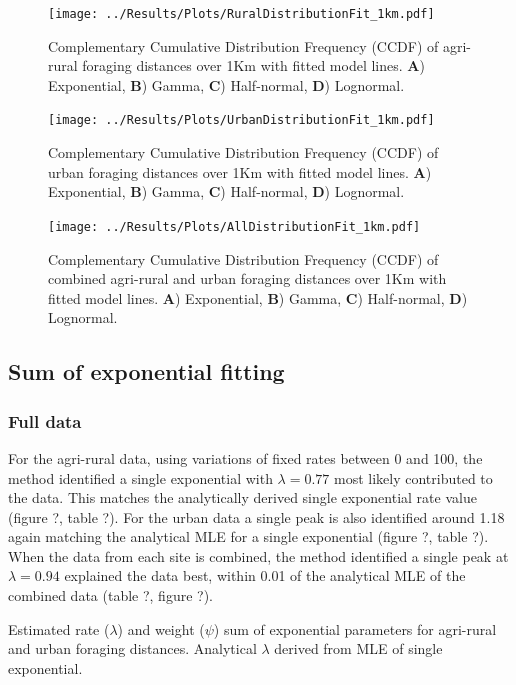 \documentclass[11pt,usenames,dvipsnames,a4paper]{article}
\begin{document}
\begin{figure}[H]
	\centering
	\texttt{[image: ../Results/Plots/RuralDistributionFit\_1km.pdf]}
	\caption{Complementary Cumulative Distribution Frequency (CCDF) of agri-rural foraging distances over 1Km with fitted model lines. \textbf{A}) Exponential, \textbf{B}) Gamma, \textbf{C}) Half-normal, \textbf{D}) Lognormal.}
\end{figure}
\begin{figure}[H]
	\centering
	\texttt{[image: ../Results/Plots/UrbanDistributionFit\_1km.pdf]}
	\caption{Complementary Cumulative Distribution Frequency (CCDF) of urban foraging distances over 1Km with fitted model lines. \textbf{A}) Exponential, \textbf{B}) Gamma, \textbf{C}) Half-normal, \textbf{D}) Lognormal.}
\end{figure}
\begin{figure}[H]
	\centering
	\texttt{[image: ../Results/Plots/AllDistributionFit\_1km.pdf]}
	\caption{Complementary Cumulative Distribution Frequency (CCDF) of combined agri-rural and urban foraging distances over 1Km with fitted model lines. \textbf{A}) Exponential, \textbf{B}) Gamma, \textbf{C}) Half-normal, \textbf{D}) Lognormal.}
\end{figure}

\subsection{Sum of exponential fitting}

\subsubsection{Full data}
\begin{linenumbers}
\hspace{\parindent}
For the agri-rural data, using variations of fixed rates between 0 and 100, the method identified a single exponential with $\lambda = 0.77$ most likely contributed to the data. This matches the analytically derived single exponential rate value (figure ?, table ?). For the urban data a single peak is also identified around 1.18 again matching the analytical MLE for a single exponential (figure ?, table ?). When the data from each site is combined, the method identified a single peak at $\lambda = 0.94$ explained the data best, within 0.01 of the analytical MLE of the combined data (table ?, figure ?). 
\end{linenumbers}

\begin{table}[H]
	\centering
	\caption{Estimated rate ($\lambda$) and weight ($\psi$) sum of exponential parameters for agri-rural and urban foraging distances. Analytical $\lambda$ derived from MLE of single exponential.}
	
\end{table}
\end{document}
